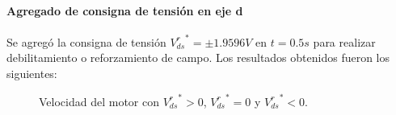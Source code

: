 \documentclass[a4paper, 10pt, onecolumn,journal]{ieeeconf}
\begin{document}
\paragraph{\textbf{Agregado de consigna de tensión en eje d}}
Se agregó la consigna de tensión ${V^r_{ds}}^* = \pm 1.9596 V $ en $t = 0.5 s$ para realizar debilitamiento o reforzamiento de campo. Los resultados obtenidos fueron los siguientes:

\begin{figure}[H]
	\centering
	\begin{adjustbox}{max width=\columnwidth}
	\end{adjustbox}
	\caption{Velocidad del motor con ${V^r_{ds}}^* > 0$, ${V^r_{ds}}^* = 0$ y ${V^r_{ds}}^* < 0$.}
	\label{Velocidad del motor con ${V^r_{ds}}^* > 0$, ${V^r_{ds}}^* = 0$ y ${V^r_{ds}}^* < 0$}
\end{figure}
\end{document}
